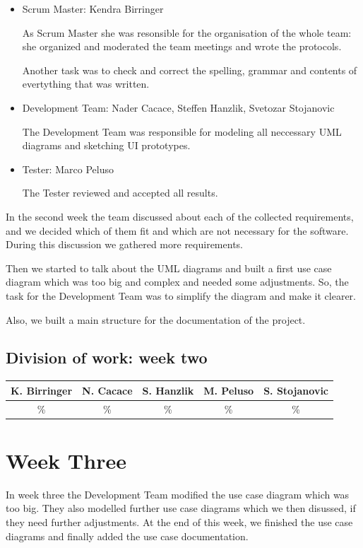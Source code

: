 \documentclass[a4paper, 12pt]{article}
\begin{document}
\begin{itemize}
\item Scrum Master: Kendra Birringer


As Scrum Master she was resonsible for the organisation of the whole team: she organized and moderated the team meetings and wrote the protocols. 

Another task was to check and correct the spelling, grammar and contents of evertything that was written.

\item Development Team: Nader Cacace, Steffen Hanzlik, Svetozar Stojanovic

The Development Team was responsible for modeling all neccessary UML diagrams and sketching UI prototypes.

\item Tester: Marco Peluso

The Tester reviewed and accepted all results.
\end{itemize}


In the second week the team discussed about each of the collected requirements, and we decided which of them fit and which are not necessary for the software. During this discussion we gathered more requirements.

Then we started to talk about the UML diagrams and built a first use case diagram which was too big and complex and needed some adjustments. So, the task for the Development Team was to simplify the diagram and make it clearer.

Also, we built a main structure for the documentation of the project.

\subsection{Division of work: week two}
\begin{table}[h]
\centering
\setlength{\tabcolsep}{12pt}
\begin{tabular}{|c|c|c|c|c|}
\hline
K. Birringer & N. Cacace & S. Hanzlik & M. Peluso & S. Stojanovic\\
\hline
\% & \% & \% & \% & \% \\ 
\hline
\end{tabular}
\end{table}
\section{Week Three}
In week three the Development Team modified the use case diagram which was too big. They also modelled further use case diagrams which we then disussed, if they need further adjustments. At the end of this week, we finished the use case diagrams and finally added the use case documentation.
\end{document}
